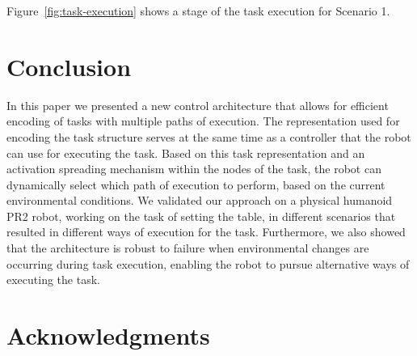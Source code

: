 \documentclass[conference]{article}
\begin{document}
Figure~\ref{fig:task-execution} shows a stage of the task execution for Scenario 1. 





\section{Conclusion}
\label{conclusion}
In this paper we presented a new control architecture that allows for efficient encoding of tasks with multiple paths of execution. The representation used for encoding the task structure serves at the same time as a controller that the robot can use for executing the task. Based on this task representation and an activation spreading mechanism within the nodes of the task, the robot can dynamically select which path of execution to perform, based on the current environmental conditions. We validated our approach on a physical humanoid PR2 robot, working on the task of setting the table, in different scenarios that resulted in different ways of execution for the task. Furthermore, we also showed that the architecture is robust to failure when environmental changes are occurring during task execution, enabling the robot to pursue alternative ways of executing the task.
\section*{Acknowledgments}





\end{document}
